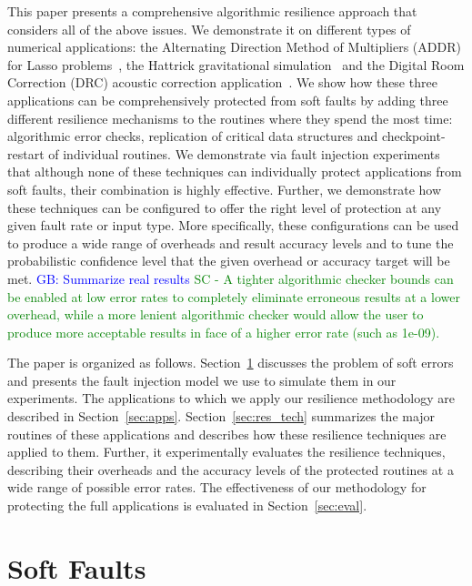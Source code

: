 \documentclass{sig-alternate}
\newcommand{\sui}[1]{%
  \textcolor{green}{SC - #1}
}
\newcommand{\greg}[1]{%
  \textcolor{blue}{GB: #1}
}
\begin{document}
This paper presents a comprehensive algorithmic resilience approach that considers all of the above issues.
We demonstrate it on different types of numerical applications: the Alternating Direction Method of Multipliers (ADDR) for Lasso problems~\cite{lasso:2011}, the Hattrick gravitational simulation~\cite{hattrick:2012} and the Digital Room Correction (DRC) acoustic correction application~\cite{drc:2012}.
We show how these three applications can be comprehensively protected from soft faults by adding three different resilience mechanisms to the routines where they spend the most time: algorithmic error checks, replication of critical data structures and checkpoint-restart of individual routines.
We demonstrate via fault injection experiments that although none of these techniques can individually protect applications from soft faults, their combination is highly effective.
Further, we demonstrate how these techniques can be configured to offer the right level of protection at any given fault rate or input type.
More specifically, these configurations can be used to produce a wide range of overheads and result accuracy levels and to tune the probabilistic confidence level that the given overhead or accuracy target will be met.
\greg{Summarize real results} \sui{A tighter algorithmic checker bounds can be enabled at low error rates to completely eliminate erroneous results at a lower overhead, while a more lenient algorithmic checker would allow the user to produce more acceptable results in face of a higher error rate (such as 1e-09).}

The paper is organized as follows.
Section~\ref{sec:soft_faults} discusses the problem of soft errors and presents the fault injection model we use to simulate them in our experiments.
The applications to which we apply our resilience methodology are described in Section~\ref{sec:apps}.
Section~\ref{sec:res_tech} summarizes the major routines of these applications and describes how these resilience techniques are applied to them.
Further, it experimentally evaluates the resilience techniques, describing their overheads and the accuracy levels of the protected routines at a wide range of possible error rates.
The effectiveness of our methodology for protecting the full applications is evaluated in Section~\ref{sec:eval}.

\section{Soft Faults}
\label{sec:soft_faults}
\end{document}
